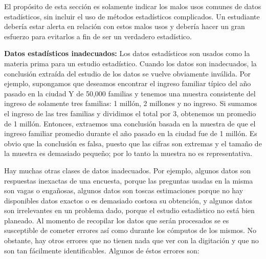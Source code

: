 \documentclass[a4paper]{report} %
\begin{document}
El prop\'osito de esta secci\'on es solamente indicar los malos usos comunes de datos estad\'isticos, sin incluir el uso de m\'etodos estad\'isticos complicados. Un estudiante deber\'ia estar alerta en relaci\'on con estos malos usos y deber\'ia hacer un gran esfuerzo para evitarlos a fin de ser un verdadero estad\'istico.

\textbf{Datos estad\'isticos inadecuados:} Los datos estad\'isticos son usados como la materia prima para un estudio estad\'istico. Cuando los datos son inadecuados, la conclusi\'on extra\'ida del estudio de los datos se vuelve obviamente inv\'alida. Por ejemplo, supongamos que deseamos encontrar el ingreso familiar t\'ipico del a\~no pasado en la ciudad Y de 50,000 familias y tenemos una muestra consistente del ingreso de solamente tres familias: 1 mill\'on, 2 millones y no ingreso. Si sumamos el ingreso de las tres familias y dividimos el total por 3, obtenemos un promedio de 1 mill\'on. Entonces, extraemos una conclusi\'on basada en la muestra de que el ingreso familiar promedio durante el a\~no pasado en la ciudad fue de 1 mill\'on. Es obvio que la conclusi\'on es falsa, puesto que las cifras son extremas y el tama\~no de la muestra es demasiado peque\~no; por lo tanto la muestra no es representativa. 

Hay muchas otras clases de datos inadecuados. Por ejemplo, algunos datos son respuestas inexactas de una encuesta, porque las preguntas usadas en la misma son vagas o enga\~nosas, algunos datos son toscas estimaciones porque no hay disponibles datos exactos o es demasiado costosa su obtenci\'on, y algunos datos son irrelevantes en un problema dado, porque el estudio estad\'istico no est\'a bien planeado. Al momento de recopilar los datos que ser\'an procesados se es susceptible de cometer errores as\'i como durante los c\'omputos de los mismos. No obstante, hay otros errores que no tienen nada que ver con la digitaci\'on y que no son tan f\'acilmente identificables. Algunos de \'estos errores son:
\end{document}
